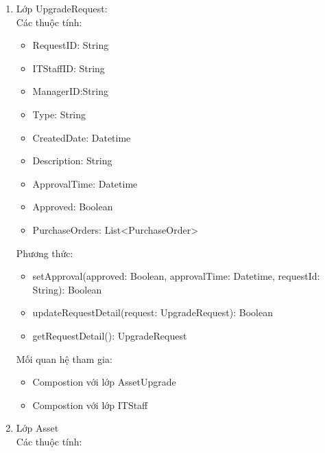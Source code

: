 \begin{enumerate}
\begin{itemize}[label=--]
        \item modifyThreshold(threshold: Threshold,ModifyDate: Datetime): Boolean
        \item createUpgradeRequest(List<Asset>): Boolean
    \end{itemize}
    Mối quan hệ tham gia:
    \begin{itemize}[label=--]
        \item Association với lớp Error, Threshold, Implementation
        \item Compostion với lớp upgradeRequest, Maintenance
        \item Aggregation với lớp AssetAssignment
    \end{itemize}
    \item Lớp UpgradeRequest:\\
    Các thuộc tính:
    \begin{itemize}[label=--]
        \item RequestID: String
        \item ITStaffID: String
        \item ManagerID:String
        \item Type: String
        \item CreatedDate: Datetime
        \item Description: String
        \item ApprovalTime: Datetime
        \item Approved: Boolean
        \item PurchaseOrders: List<PurchaseOrder>
    \end{itemize}
    Phương thức:
    \begin{itemize}[label=--]
        \item setApproval(approved: Boolean, approvalTime: Datetime, requestId: String): Boolean
        \item updateRequestDetail(request: UpgradeRequest): Boolean
        \item getRequestDetail(): UpgradeRequest
    \end{itemize}
    Mối quan hệ tham gia:
    \begin{itemize}[label=--]
        \item Compostion với lớp AssetUpgrade
        \item Compostion với lớp ITStaff
    \end{itemize}
    \item Lớp Asset\\
    Các thuộc tính:
    \begin{itemize}[label=--]

\end{itemize}
\end{enumerate}
